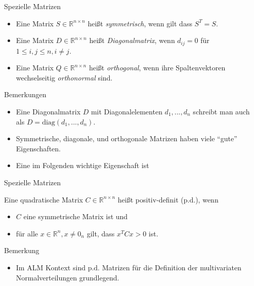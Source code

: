 \documentclass[
  8pt,
  ignorenonframetext,
]{beamer}
\providecommand{\tightlist}{%
  \setlength{\itemsep}{0pt}\setlength{\parskip}{0pt}}
\begin{document}
\begin{frame}{Spezielle Matrizen}
\protect\hypertarget{spezielle-matrizen-1}{}
\footnotesize
\begin{definition}
\begin{itemize}
\item Eine Matrix $S \in \mathbb{R}^{n \times n}$ heißt \textit{symmetrisch}, wenn gilt dass $S^T = S$.
\item Eine Matrix $D \in \mathbb{R}^{n \times n}$ heißt \textit{Diagonalmatrix}, wenn $d_{ij} = 0$ für $1 \le i,j \le n, i \neq j$.
\item Eine Matrix $Q \in \mathbb{R}^{n \times n}$ heißt \textit{orthogonal}, wenn ihre Spaltenvektoren wechselseitig \textit{orthonormal} sind.
\end{itemize}
\end{definition}

Bemerkungen

\begin{itemize}
\item Eine Diagonalmatrix $D$ mit Diagonalelementen $d_1,...,d_n$ schreibt man auch als $ D= \mbox{diag}(d_1,...,d_n)$.
\item Symmetrische, diagonale, und orthogonale Matrizen haben viele ``gute'' Eigenschaften.
\item Eine im Folgenden wichtige Eigenschaft ist
\begin{itemize}
\end{itemize}
\end{itemize}
\end{frame}

\begin{frame}{Spezielle Matrizen}
\protect\hypertarget{spezielle-matrizen-2}{}
\small
\begin{definition}
Eine quadratische Matrix $C \in \mathbb{R}^{n \times n}$ heißt positiv-definit ($\mbox{p.d.}$), wenn
\begin{itemize}
\item $C$ eine symmetrische Matrix ist und
\item für alle $x \in \mathbb{R}^n, x \neq 0_n$ gilt, dass $x^TCx > 0$ ist.
\end{itemize}
\end{definition}

\footnotesize

Bemerkung

\begin{itemize}
\tightlist
\item
  Im ALM Kontext sind \(\mbox{p.d.}\) Matrizen für die Definition der
  multivariaten Normalverteilungen grundlegend.
\end{itemize}
\end{frame}
\end{document}
